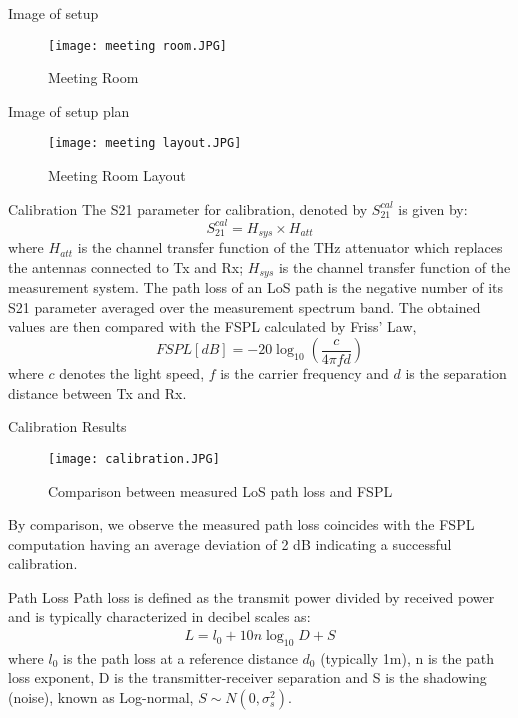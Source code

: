 \documentclass{beamer}
\providecommand{\brak}[1]{\ensuremath{\left(#1\right)}}
\begin{document}
\begin{frame}{Image of setup}
\begin{figure}[!ht]
\centering
\texttt{[image: meeting room.JPG]}
\caption{Meeting Room}
\label{image 1}
\end{figure}
\end{frame}
\begin{frame}{Image of setup plan}
\begin{figure}[!ht]
\centering
\texttt{[image: meeting layout.JPG]}
\caption{Meeting Room Layout}
\label{image 2}
\end{figure}
\end{frame}
\begin{frame}{Calibration}
The S21 parameter for calibration, denoted by $S_{21}^{cal}$ is given by: 
$$S_{21}^{cal} = H_{sys}\times H_{att}$$
where $H_{att}$ is the channel transfer function of the THz attenuator which replaces the antennas connected to Tx and Rx; $H_{sys}$ is the channel transfer function of the measurement
system. The path loss of an LoS path is the negative number of its S21 parameter averaged over the measurement spectrum band.
The obtained values are then compared with the FSPL calculated by Friss' Law,
$$FSPL[dB] = -20\log_{10}\brak{\frac{c}{4\pi fd}}$$
where $c$ denotes the light speed, $f$ is the carrier frequency and $d$ is the separation distance between Tx and Rx.
\end{frame}
\begin{frame}{Calibration Results}
\begin{figure}[!ht]
\centering
\texttt{[image: calibration.JPG]}
\caption{Comparison between measured LoS path loss and FSPL}
\label{image 3}
\end{figure}
By comparison, we observe the measured path loss coincides with the FSPL computation having an average deviation of 2 dB indicating a successful calibration.
\end{frame}
\begin{frame}{Path Loss}
Path loss is defined as the transmit power divided by received power and is typically characterized in decibel scales as:
\begin{align}
    L = l_0 + 10n\log_{10}D + S
\end{align}
where $l_0$ is the path loss at a reference distance $d_0$ (typically 1m), n is the path loss exponent, D is the transmitter-receiver separation and S is the shadowing (noise), known as Log-normal, $S\sim N(0, \sigma_s^2)$.
\end{frame}
\end{document}
